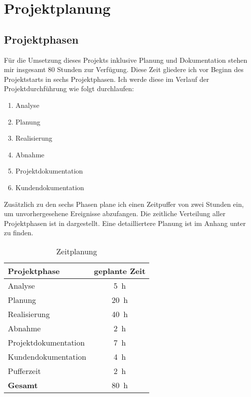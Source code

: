 \section{Projektplanung}

\subsection{Projektphasen}
Für die Umsetzung dieses Projekts inklusive Planung und Dokumentation stehen mir insgesamt 80 Stunden zur Verfügung.
Diese Zeit gliedere ich vor Beginn des Projektstarts in sechs Projektphasen.
Ich werde diese im Verlauf der Projektdurchführung wie folgt durchlaufen:

\begin{enumerate}
  \item Analyse
  \item Planung
  \item Realisierung
  \item Abnahme
  \item Projektdokumentation
  \item Kundendokumentation
\end{enumerate}

\noindent
Zusätzlich zu den sechs Phasen plane ich einen Zeitpuffer von zwei Stunden ein, um unvorhergesehene Ereignisse abzufangen.
Die zeitliche Verteilung aller Projektphasen ist in  dargestellt.
Eine detailliertere Planung ist im Anhang unter  zu finden.

\begin{table}[H]
  \centering
  \begin{tabular}{|l | c|}
    \hline
    \textbf{Projektphase} & \textbf{geplante Zeit} \\
    \hline
    Analyse                 & \qty{5}{\hour}  \\
    Planung                 & \qty{20}{\hour} \\
    Realisierung            & \qty{40}{\hour} \\
    Abnahme                 & \qty{2}{\hour}  \\
    Projektdokumentation    & \qty{7}{\hour}  \\
    Kundendokumentation     & \qty{4}{\hour}  \\
    Pufferzeit              & \qty{2}{\hour}  \\
    \hline
    \textbf{Gesamt}         & \qty{80}{\hour} \\
    \hline
  \end{tabular}
  \caption{Zeitplanung}
  \label{tab:zeitplanung}
\end{table}

